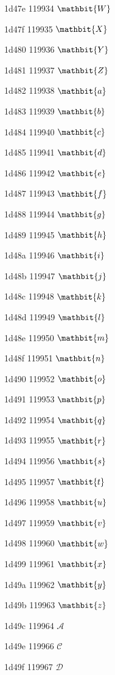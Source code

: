 \documentclass[11pt]{article}
\begin{document}
1d47e 119934 \ensuremath{\mathbit{W}}

1d47f 119935 \ensuremath{\mathbit{X}}

1d480 119936 \ensuremath{\mathbit{Y}}

1d481 119937 \ensuremath{\mathbit{Z}}

1d482 119938 \ensuremath{\mathbit{a}}

1d483 119939 \ensuremath{\mathbit{b}}

1d484 119940 \ensuremath{\mathbit{c}}

1d485 119941 \ensuremath{\mathbit{d}}

1d486 119942 \ensuremath{\mathbit{e}}

1d487 119943 \ensuremath{\mathbit{f}}

1d488 119944 \ensuremath{\mathbit{g}}

1d489 119945 \ensuremath{\mathbit{h}}

1d48a 119946 \ensuremath{\mathbit{i}}

1d48b 119947 \ensuremath{\mathbit{j}}

1d48c 119948 \ensuremath{\mathbit{k}}

1d48d 119949 \ensuremath{\mathbit{l}}

1d48e 119950 \ensuremath{\mathbit{m}}

1d48f 119951 \ensuremath{\mathbit{n}}

1d490 119952 \ensuremath{\mathbit{o}}

1d491 119953 \ensuremath{\mathbit{p}}

1d492 119954 \ensuremath{\mathbit{q}}

1d493 119955 \ensuremath{\mathbit{r}}

1d494 119956 \ensuremath{\mathbit{s}}

1d495 119957 \ensuremath{\mathbit{t}}

1d496 119958 \ensuremath{\mathbit{u}}

1d497 119959 \ensuremath{\mathbit{v}}

1d498 119960 \ensuremath{\mathbit{w}}

1d499 119961 \ensuremath{\mathbit{x}}

1d49a 119962 \ensuremath{\mathbit{y}}

1d49b 119963 \ensuremath{\mathbit{z}}

1d49c 119964 \ensuremath{\mathscr{A}}

1d49e 119966 \ensuremath{\mathscr{C}}

1d49f 119967 \ensuremath{\mathscr{D}}
\end{document}
